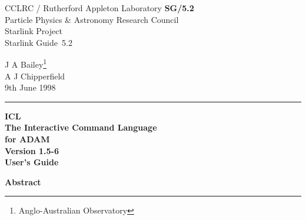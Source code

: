 \documentclass[twoside,11pt]{report}
\newcommand{\stardoccategory}  {Starlink Guide}
\newcommand{\stardocinitials}  {SG}
\newcommand{\stardocnumber}    {5.2}
\newcommand{\stardocauthors}   {J A Bailey\footnote{Anglo-Australian
Observatory}\\A J Chipperfield}
\newcommand{\stardocdate}      {9th June 1998}
\newcommand{\stardoctitle}     {ICL\\[2.5ex]
                                The Interactive Command Language\\
                                for ADAM}
\newcommand{\stardocversion}   {Version 1.5-6}
\newcommand{\stardocmanual}    {User's Guide}
\newcommand{\stardocname}{\stardocinitials /\stardocnumber}
\newenvironment{latexonly}{}{}
\begin{document}
\thispagestyle{empty}

\begin{latexonly}
   CCLRC / {\sc Rutherford Appleton Laboratory} \hfill {\bf \stardocname}\\
   {\large Particle Physics \& Astronomy Research Council}\\
   {\large Starlink Project\\}
   {\large \stardoccategory\ \stardocnumber}
   \begin{flushright}
   \stardocauthors\\
   \stardocdate
   \end{flushright}
   \vspace{-4mm}
   \rule{\textwidth}{0.5mm}
   \vspace{5mm}
   \begin{center}
   {\Huge\bf  \stardoctitle \\ [2.5ex]}
   {\LARGE\bf \stardocversion \\ [4ex]}
   {\Huge\bf  \stardocmanual}
   \end{center}
   \vspace{5mm}


   \vspace{10mm}
   \begin{center}
      {\Large\bf Abstract}
   \end{center}
\end{latexonly}
\end{document}
